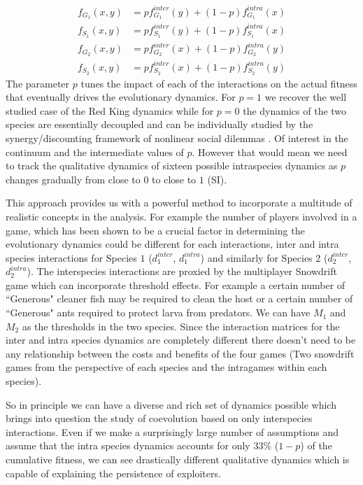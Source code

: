 \documentclass{pnastwo}
\begin{document}
\begin{article}
%
\begin{align}
	f_{G_1} (x,y) &= p f^{inter}_{G_1} (y) + (1-p) f^{intra}_{G_1} (x) \\
	f_{S_1} (x,y) &= p f^{inter}_{S_1} (y) + (1-p) f^{intra}_{S_1} (x) \\
	f_{G_2} (x,y) &= p f^{inter}_{G_2} (x) + (1-p) f^{intra}_{G_2} (y) \\
	f_{S_2} (x,y) &= p f^{inter}_{S_2} (x) + (1-p) f^{intra}_{S_2} (y)
\end{align}
%
The parameter $p$ tunes the impact of each of the interactions on the actual fitness that eventually drives the evolutionary dynamics.
For $p=1$ we recover the well studied case of the Red King dynamics \cite{gokhale:PRSB:2012} while for $p=0$ the dynamics of the two species are essentially decoupled and can be individually studied by the synergy/discounting framework of nonlinear social dilemmas \cite{hauert:JTB:2006a}.
Of interest in the continuum and the intermediate values of $p$.
However that would mean we need to track the qualitative dynamics of sixteen possible intraspecies dynamics as $p$ changes gradually from close to $0$ to close to $1$ (SI). 

This approach provides us with a powerful method to incorporate a multitude of realistic concepts in the analysis.
For example the number of players involved in a game, which has been shown to be a crucial factor in determining the evolutionary dynamics could be different for each interactions, inter and intra species interactions for Species $1$ ($d^{inter}_1$, $d^{intra}_1$) and similarly for Species 2 ($d^{inter}_2$, $d^{intra}_2$). 
The interspecies interactions are proxied by the multiplayer Snowdrift game which can incorporate threshold effects.
For example a certain number of ``Generous" cleaner fish may be required to clean the host or a certain number of ``Generous" ants required to protect larva from predators.
We can have $M_1$ and $M_2$ as the thresholds in the two species.
Since the interaction matrices for the inter and intra species dynamics are completely different there doesn't need to be any relationship between the costs and benefits of the four games (Two snowdrift games from the perspective of each species and the intragames within each species).

So in principle we can have a diverse and rich set of dynamics possible which brings into question the study of coevolution based on only interspecies interactions. Even if we make a surprisingly large number of assumptions and assume that the intra species dynamics accounts for only $33\%$ ($1-p$) of the cumulative fitness, we can see drastically different qualitative dynamics which is capable of explaining the persistence of exploiters.


\end{article}
\end{document}
